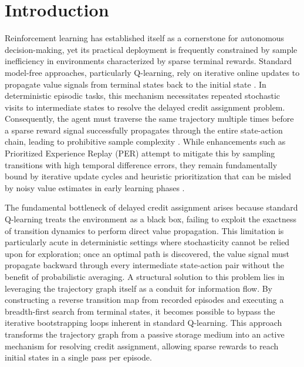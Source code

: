 \documentclass[manuscript, screen, review]{jair}
\begin{document}
\section{Introduction}
Reinforcement learning has established itself as a cornerstone for autonomous decision-making, yet its practical deployment is frequently constrained by sample inefficiency in environments characterized by sparse terminal rewards. Standard model-free approaches, particularly Q-learning, rely on iterative online updates to propagate value signals from terminal states back to the initial state \cite{Rastogi2020IsQP}. In deterministic episodic tasks, this mechanism necessitates repeated stochastic visits to intermediate states to resolve the delayed credit assignment problem. Consequently, the agent must traverse the same trajectory multiple times before a sparse reward signal successfully propagates through the entire state-action chain, leading to prohibitive sample complexity \cite{Meyn2024ThePB}. While enhancements such as Prioritized Experience Replay (PER) attempt to mitigate this by sampling transitions with high temporal difference errors, they remain fundamentally bound by iterative update cycles and heuristic prioritization that can be misled by noisy value estimates in early learning phases \cite{CarrascoDavis2025UncertaintyPE,Jin2021BellmanED}.

The fundamental bottleneck of delayed credit assignment arises because standard Q-learning treats the environment as a black box, failing to exploit the exactness of transition dynamics to perform direct value propagation. This limitation is particularly acute in deterministic settings where stochasticity cannot be relied upon for exploration; once an optimal path is discovered, the value signal must propagate backward through every intermediate state-action pair without the benefit of probabilistic averaging. A structural solution to this problem lies in leveraging the trajectory graph itself as a conduit for information flow. By constructing a reverse transition map from recorded episodes and executing a breadth-first search from terminal states, it becomes possible to bypass the iterative bootstrapping loops inherent in standard Q-learning. This approach transforms the trajectory graph from a passive storage medium into an active mechanism for resolving credit assignment, allowing sparse rewards to reach initial states in a single pass per episode.
\end{document}
